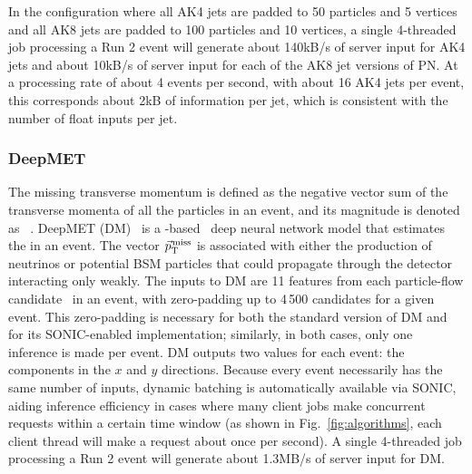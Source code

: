 In the configuration where all AK4 jets are padded to 50 particles and 5 vertices and all AK8 jets are padded to 100 particles and 10 vertices, a single 4-threaded job processing a Run 2 \ttbar event will generate about 140\unit{kB/s} of server input for AK4 jets and about 10\unit{kB/s} of server input for each of the AK8 jet versions of PN. At a processing rate of about 4 events per second, with about 16 AK4 jets per event, this corresponds about 2\unit{kB} of information per jet, which is consistent with the number of float inputs per jet.



\subsubsection{DeepMET}
The missing transverse momentum \ptvecmiss is defined as the negative vector sum of the transverse momenta of all the particles in an event, and its magnitude is denoted as \ptmiss~\cite{CMS:2019ctu}. DeepMET (DM)~\cite{DeepMET} is a \TENSORFLOW-based~\cite{tensorflow} deep neural network model that estimates the \ptvecmiss in an event. The vector ${\vec p}_{\mathrm{T}}^{\kern1pt\text{miss}}$ is associated with either the production of neutrinos or potential BSM particles that could propagate through the detector interacting only weakly. The inputs to DM are 11 features from each particle-flow candidate~\cite{CMS:2017yfk} in an event, with zero-padding up to 4\,500 candidates for a given event. This zero-padding is necessary for both the standard version of DM and for its SONIC-enabled implementation; similarly, in both cases, only one inference is made per event. DM outputs two values for each event: the \ptvecmiss components in the $x$ and $y$ directions. Because every event necessarily has the same number of inputs, dynamic batching is automatically available via SONIC, aiding inference efficiency in cases where many client jobs make concurrent requests within a certain time window (as shown in Fig.~\ref{fig:algorithms}, each client thread will make a request about once per second). A single 4-threaded job processing a Run 2 \ttbar event will generate about 1.3\unit{MB/s} of server input for DM.

